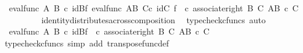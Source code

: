\begin{isabellebody}
\ {\isachardoublequoteopen}{\isachardot}{\kern0pt}{\isachardot}{\kern0pt}{\isachardot}{\kern0pt}\ {\isacharequal}{\kern0pt}{\isacharparenleft}{\kern0pt}eval{\isacharunderscore}{\kern0pt}func\ A\ B{\isacharparenright}{\kern0pt}\ {\isasymcirc}\isactrlsub c\ {\isacharparenleft}{\kern0pt}id{\isacharparenleft}{\kern0pt}B{\isacharparenright}{\kern0pt}{\isasymtimes}\isactrlsub f\ {\isacharparenleft}{\kern0pt}{\isacharparenleft}{\kern0pt}eval{\isacharunderscore}{\kern0pt}func\ {\isacharparenleft}{\kern0pt}A\isactrlbsup B\isactrlesup {\isacharparenright}{\kern0pt}\ C{\isacharparenright}{\kern0pt}{\isasymcirc}\isactrlsub c\ {\isacharparenleft}{\kern0pt}id{\isacharparenleft}{\kern0pt}C{\isacharparenright}{\kern0pt}\ {\isasymtimes}\isactrlsub f\ {\isasymphi}\isactrlsup {\isasymsharp}\isactrlsup {\isasymsharp}{\isacharparenright}{\kern0pt}{\isacharparenright}{\kern0pt}{\isacharparenright}{\kern0pt}\ {\isasymcirc}\isactrlsub c\ {\isacharparenleft}{\kern0pt}associate{\isacharunderscore}{\kern0pt}right\ B\ C\ {\isacharparenleft}{\kern0pt}A\isactrlbsup {\isacharparenleft}{\kern0pt}B\ {\isasymtimes}\isactrlsub c\ C{\isacharparenright}{\kern0pt}\isactrlesup {\isacharparenright}{\kern0pt}{\isacharparenright}{\kern0pt}{\isachardoublequoteclose}\isanewline
\ \ \ \ \ \ \ \ \isamarkupfalse%
\ identity{\isacharunderscore}{\kern0pt}distributes{\isacharunderscore}{\kern0pt}across{\isacharunderscore}{\kern0pt}composition\ \isamarkupfalse%
\ {\isacharparenleft}{\kern0pt}typecheck{\isacharunderscore}{\kern0pt}cfuncs{\isacharcomma}{\kern0pt}\ auto{\isacharparenright}{\kern0pt}\isanewline
\ \ \ \ \ \ \isamarkupfalse%
\ \isamarkupfalse%
\ {\isachardoublequoteopen}{\isachardot}{\kern0pt}{\isachardot}{\kern0pt}{\isachardot}{\kern0pt}\ {\isacharequal}{\kern0pt}{\isacharparenleft}{\kern0pt}eval{\isacharunderscore}{\kern0pt}func\ A\ B{\isacharparenright}{\kern0pt}\ {\isasymcirc}\isactrlsub c\ {\isacharparenleft}{\kern0pt}id{\isacharparenleft}{\kern0pt}B{\isacharparenright}{\kern0pt}{\isasymtimes}\isactrlsub f\ {\isasymphi}\isactrlsup {\isasymsharp}{\isacharparenright}{\kern0pt}\ {\isasymcirc}\isactrlsub c\ {\isacharparenleft}{\kern0pt}associate{\isacharunderscore}{\kern0pt}right\ B\ C\ {\isacharparenleft}{\kern0pt}A\isactrlbsup {\isacharparenleft}{\kern0pt}B\ {\isasymtimes}\isactrlsub c\ C{\isacharparenright}{\kern0pt}\isactrlesup {\isacharparenright}{\kern0pt}{\isacharparenright}{\kern0pt}{\isachardoublequoteclose}\isanewline
\ \ \ \ \ \ \ \ \isamarkupfalse%
\ {\isacharparenleft}{\kern0pt}typecheck{\isacharunderscore}{\kern0pt}cfuncs{\isacharcomma}{\kern0pt}\ simp\ add{\isacharcolon}{\kern0pt}\ transpose{\isacharunderscore}{\kern0pt}func{\isacharunderscore}{\kern0pt}def{\isacharparenright}{\kern0pt}\isanewline

\end{isabellebody}

